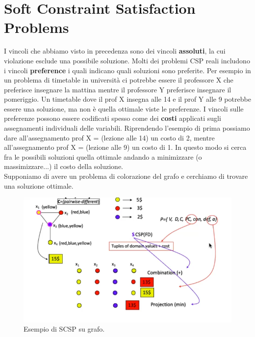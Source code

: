 \section{Soft Constraint Satisfaction Problems}
I vincoli che abbiamo visto in precedenza sono dei vincoli \textbf{assoluti}, la cui violazione esclude una possibile soluzione. Molti dei problemi CSP reali includono i vincoli \textbf{preference} i quali indicano quali soluzioni sono preferite. Per esempio in un problema di timetable in università ci potrebbe essere il professore X che preferisce insegnare la mattina mentre il professore Y preferisce insegnare il pomeriggio. Un timetable dove il prof X insegna alle 14 e il prof Y alle 9 potrebbe essere una soluzione, ma non è quella ottimale viste le preferenze. I vincoli sulle preferenze possono essere codificati spesso come dei \textbf{costi} applicati sugli assegnamenti individuali delle variabili. Riprendendo l'esempio di prima possiamo dare all'assegnamento prof X = (lezione alle 14) un costo di 2, mentre all'assegnamento prof X = (lezione alle 9) un costo di 1. In questo modo si cerca fra le possibili soluzioni quella ottimale andando a minimizzare (o massimizzare...) il costo della soluzione. \\
Supponiamo di avere un problema di colorazione del grafo e cerchiamo di trovare una soluzione ottimale. 
\begin{figure}[H]
    \centering
    \includegraphics[width=12cm, keepaspectratio]{img/scsp_grafo.png}
    \caption{Esempio di SCSP su grafo.}\label{fig:scps_grafo}
\end{figure}


